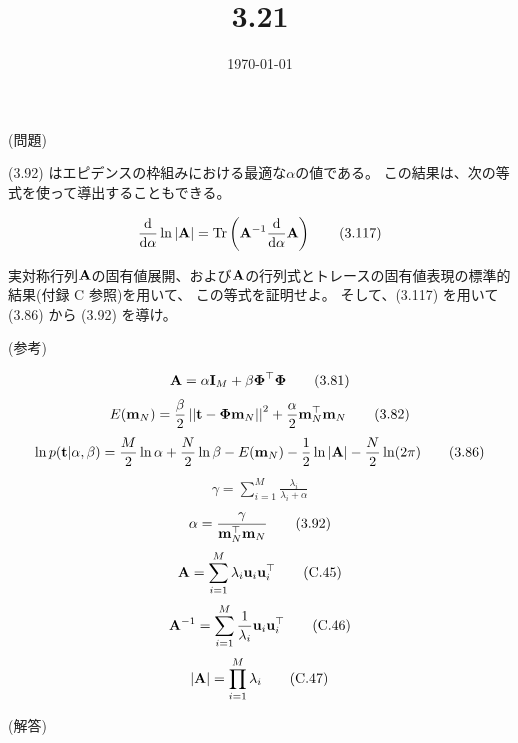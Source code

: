 \documentclass{jsarticle}
\title{3.21}
\date{\today}
\begin{document}
\maketitle

(問題)

(3.92) はエピデンスの枠組みにおける最適な$\alpha$の値である。
この結果は、次の等式を使って導出することもできる。

\begin{align*}
    \frac{\rm d}{{\rm d}\alpha}\ln|{\bf A}|={\rm Tr}\left({\bf A}^{-1}\frac{\rm d}{{\rm d}\alpha}{\bf A}\right)\tag{3.117}
    \end{align*}

実対称行列$\bf A$の固有値展開、および$\bf A$の行列式とトレースの固有値表現の標準的結果(付録 C 参照)を用いて、
この等式を証明せよ。
そして、(3.117) を用いて (3.86) から (3.92) を導け。

(参考)

\begin{align}
    {\bf A}=\alpha{\bf I}_M+\beta{\boldsymbol\Phi}^\top{\boldsymbol\Phi}\tag{3.81}
    \end{align}
\begin{align}
    E({\bf m}_N)=\frac{\beta}{2}  \left | \left | \mathbf t-\boldsymbol \Phi \mathbf m_N \right | \right | ^ 2+\frac{\alpha}{2}\mathbf m_N^\top \mathbf m_N\tag{3.82}
    \end{align}
\begin{align}
    \ln p({\bf t}|\alpha,\beta)=\frac{M}{2}\ln\alpha+\frac{N}{2}\ln\beta-E({\bf m}_N)-\frac{1}{2}\ln|{\bf A}|-\frac{N}{2}\ln(2\pi)\tag{3.86}
    \end{align}
\begin{align}
    \gamma=\sum_{i=1}^M\frac{\lambda_i}{\lambda_i+\alpha}\tag{3.91}
    \end{align}
\begin{align}
    \alpha=\frac{\gamma}{{\bf m}_N^\top{\bf m}_N}\tag{3.92}
    \end{align}
\begin{align}
    {\bf A}=\sum_{i=1}^M\lambda_i{\bf u}_i{\bf u}_i^\top\tag{C.45}
    \end{align}
\begin{align}
    {\bf A}^{-1}=\sum_{i=1}^M\frac{1}{\lambda_i}{\bf u}_i{\bf u}_i^\top\tag{C.46}
    \end{align}
\begin{align}
    |{\bf A}|=\prod_{i=1}^M\lambda_i\tag{C.47}
    \end{align}

(解答)
\end{document}
